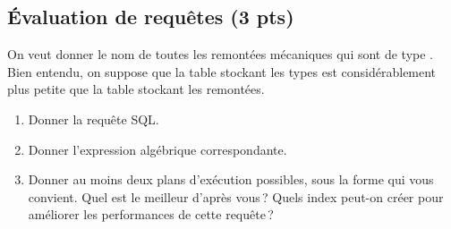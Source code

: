\subsection*{\'Evaluation de requêtes (3 pts)}

On veut donner le nom de toutes les remontées
mécaniques qui sont de type . Bien entendu, on suppose
que la table stockant les types est considérablement plus petite
que la table stockant les remontées.

\begin{enumerate}
   \item Donner la requête SQL.
   \item Donner l'expression algébrique correspondante.
    \item Donner au moins deux plans d'exécution possibles, sous la 
             forme qui vous convient.
          Quel est le meilleur d'après vous\,? Quels
     index peut-on créer pour améliorer les performances de cette requête\,?

\end{enumerate}
